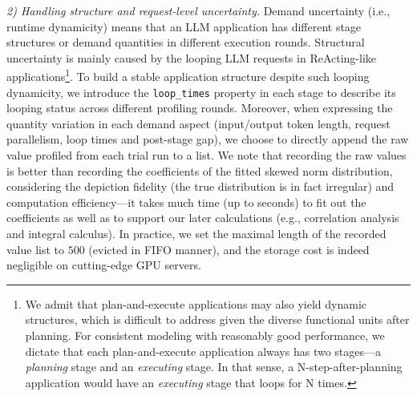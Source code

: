 \textit{2) Handling structure and request-level uncertainty.}
Demand uncertainty (i.e., runtime dynamicity) means that an LLM application has different stage structures or demand quantities in different execution rounds.
Structural uncertainty is mainly caused by the looping LLM requests in ReActing-like applications\footnote{
We admit that plan-and-execute applications may also yield dynamic structures, which is difficult to address given the diverse functional units after planning. 
For consistent modeling with reasonably good performance, we dictate that each plan-and-execute application always has two stages---a \emph{planning} stage and an \emph{executing} stage. %
In that sense, a N-step-after-planning application would have an \emph{executing} stage that loops for N times. 
}.
To build a stable application structure despite such looping dynamicity, we introduce the \texttt{loop\_times} property in each stage to describe its looping status across different profiling rounds.
Moreover, when expressing the quantity variation in each demand aspect (input/output token length, request parallelism, loop times and post-stage gap), we choose to 
directly append the raw value profiled from each trial run to a list. 
We note that recording the raw values is better than recording the coefficients of the fitted skewed norm distribution, considering the depiction fidelity (the true distribution is in fact irregular) and computation efficiency---it takes much time (up to seconds) to fit out the coefficients as well as to support our later calculations (e.g., correlation analysis and integral calculus).
In practice, we set the maximal length of the recorded value list to $500$ (evicted in FIFO manner), and the storage cost is indeed negligible on cutting-edge GPU servers. 
